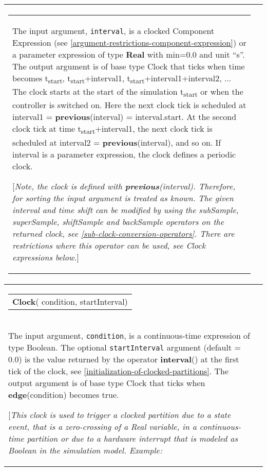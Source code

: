 \begin{longtable}[]{|p{3cm}|p{12cm}|}
\begin{tabular}{@{}p{119mm}@{}}
The input argument, \lstinline[basicstyle=\ttfamily]!interval!, is a clocked Component Expression (see
\autoref{argument-restrictions-component-expression}) or a parameter expression of type \textbf{Real} with
min=0.0 and unit ``s''. The output argument is of base type Clock that
ticks when time becomes t\textsubscript{start},
t\textsubscript{start}+interval1,
t\textsubscript{start}+interval1+interval2, ... The clock starts at the
start of the simulation t\textsubscript{start} or when the controller is
switched on. Here the next clock tick is scheduled at interval1 =
\textbf{previous}(interval) = interval.start. At the second clock tick
at time t\textsubscript{start}+interval1, the next clock tick is
scheduled at interval2 = \textbf{previous}(interval), and so on. If
interval is a parameter expression, the clock defines a periodic clock.

{[}\emph{Note, the clock is defined with \textbf{previous}(interval).
Therefore, for sorting the input argument is treated as known.}
\emph{The given interval and time shift can be modified by using the
subSample, superSample, shiftSample and backSample operators on the
returned clock, see \autoref{sub-clock-conversion-operators}. There are restrictions where
this operator can be used, see Clock expressions below.}{]}
\end{tabular}\\ \hline
\begin{tabular}{@{}p{29mm}@{}}
\textbf{Clock}(\newline
  condition,\newline
  startInterval)
\end{tabular}
&
\begin{tabular}{@{}p{119mm}@{}}
\textbf{Clock with Boolean Condition}\\

The input argument, \lstinline[basicstyle=\ttfamily]!condition!, is a continuous-time expression of type
Boolean. The optional \lstinline[basicstyle=\ttfamily]!startInterval! argument (default = 0.0) is the
value returned by the operator \textbf{interval}() at the first tick of
the clock, see \autoref{initialization-of-clocked-partitions}. The output argument is of base type Clock
that ticks when \textbf{edge}(condition) becomes true.

{[}\emph{This clock is used to trigger a clocked partition due to a
state event, that is a zero-crossing of a Real variable, in a
continuous-time partition or due to a hardware interrupt that is modeled
as Boolean in the simulation model. Example:}


\end{tabular}
\end{longtable}
